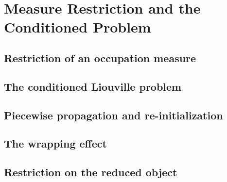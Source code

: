 
\section{Measure Restriction and the Conditioned Problem}
\label{p2:sec:restriction}

\subsection{Restriction of an occupation measure}
\label{p2:sub:restriction_of_a_measure}

\subsection{The conditioned Liouville problem}
\label{p2:sub:conditioned_liouville}

\subsection{Piecewise propagation and re-initialization}
\label{p2:sub:piecewise_propagation}

\subsection{The wrapping effect}
\label{p2:sub:wrapping_effect}

\subsection{Restriction on the reduced object}
\label{p2:sub:restriction_on_reduced_object}
